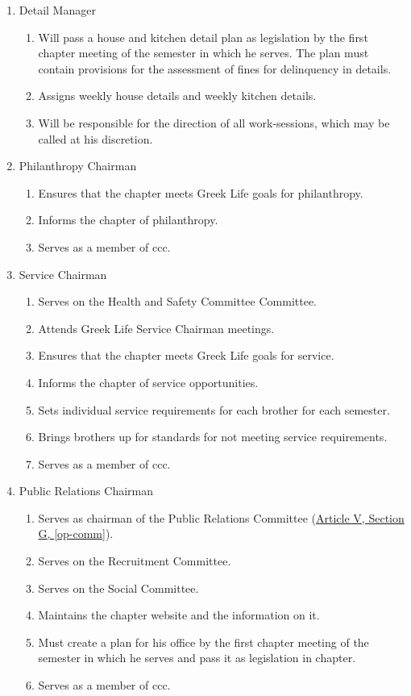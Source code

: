 \begin{enumerate}
				\item Detail Manager
					\begin{enumerate}
						\item Will pass a house and kitchen detail plan as legislation by the first chapter meeting of the semester in which he serves. The plan must contain provisions for the assessment of fines for delinquency in details.
						\item Assigns weekly house details and weekly kitchen details.
						\item Will be responsible for the direction of all \glspl{work-session}, which may be called at his discretion.
					\end{enumerate}

				\item Philanthropy Chairman
					\begin{enumerate}
						\item Ensures that the chapter meets Greek Life goals for philanthropy.
						\item Informs the chapter of philanthropy.
						\item Serves as a member of \gls{ccc}.
					\end{enumerate}
					
				\item Service Chairman
					\begin{enumerate}
						\item Serves on the Health and Safety Committee Committee.
						\item Attends Greek Life Service Chairman meetings.
						\item Ensures that the chapter meets Greek Life goals for service.
						\item Informs the chapter of service opportunities.
						\item Sets individual service requirements for each brother for each semester.
						\item Brings brothers up for standards for not meeting service requirements.
						\item Serves as a member of \gls{ccc}.
					\end{enumerate}
				
				
				\item Public Relations Chairman
					\begin{enumerate}
						\item Serves as chairman of the Public Relations Committee (\hyperref[op-comm]{Article V, Section G, \autoref*{op-comm}}).
						\item Serves on the Recruitment Committee.
						\item Serves on the Social Committee.
						\item Maintains the chapter website and the information on it.
						\item Must create a plan for his office by the first chapter meeting of the semester in which he serves and pass it as legislation in chapter.
						\item Serves as a member of \gls{ccc}.
					\end{enumerate}


\end{enumerate}
